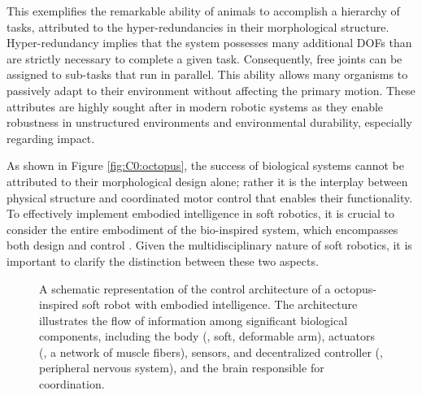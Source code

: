 This exemplifies the remarkable ability of animals to accomplish a hierarchy of tasks, attributed to the hyper-redundancies in their morphological structure. Hyper-redundancy \cite{Chirikjian1989,Chirikjian1991,Rus2015} implies that the system possesses many additional DOFs than are strictly necessary to complete a given task. Consequently, free joints can be assigned to sub-tasks that run in parallel. This ability allows many organisms to passively adapt to their environment without affecting the primary motion. These attributes are highly sought after in modern robotic systems \cite{Spong1996,Murray1994,DeLuca2016Jul} as they enable robustness in unstructured environments and environmental durability, especially regarding impact.

As shown in Figure \ref{fig:C0:octopus}, the success of biological systems cannot be attributed to their morphological design alone; rather it is the interplay between physical structure and coordinated motor control that enables their functionality.
To effectively implement embodied intelligence in soft robotics, it is crucial to consider the entire embodiment of the bio-inspired system, which encompasses both design and control \cite{Rus2015,Hawkes2017}. Given the multidisciplinary nature of soft robotics, it is important to clarify the distinction between these two aspects.


\begin{figure}
  \centering
  
  \caption{\small A schematic representation of the control architecture of a octopus-inspired soft robot with embodied intelligence. The architecture illustrates the flow of information among significant biological components, including the body (\eg, soft, deformable arm), actuators (\eg, a network of muscle fibers), sensors, and decentralized controller (\ie, peripheral nervous system), and the brain responsible for coordination. \label{fig:C0:biometic} }
  \vspace{-3mm}
\end{figure}

